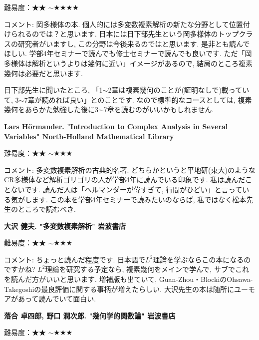 難易度：★★ $\sim$★★★★ \vspace{-6pt} 

コメント: 岡多様体の本. 個人的には多変数複素解析の新たな分野として位置付けられるのでは？と思います. 日本には日下部先生という岡多様体のトップクラスの研究者がいますし, この分野は今後来るのではと思います. 
是非とも読んでほしい. 学部4年セミナーで読んでも修士セミナーで読んでも良いです.  ただ「岡多様体は解析というよりは幾何に近い」イメージがあるので, 結局のところ複素幾何は必要だと思います.

日下部先生に聞いたところ, 「1$\sim$2章は複素幾何のことが(証明なしで)載っていて, 3$\sim$7章が読めれば良い」とのことです. なので標準的なコースとしては, 複素幾何をあらかた勉強した後に3$\sim$7章を読むのがいいかもしれません. 
\vspace{8pt}

\textbf{Lars Hörmander. "Introduction to Complex Analysis in Several Variables" North-Holland Mathematical Library}   \vspace{-6pt} 

難易度：★★ $\sim$★★★ \vspace{-6pt} 

コメント: 多変数複素解析の古典的名著. どちらかというと平地研(東大)のようなCR多様体など解析ゴリゴリの人が学部4年に読んでいる印象です. 私は読んだことないです. 読んだ人は「ヘルマンダーが偉すぎて, 行間がひどい」と言っている気がします. 
この本を学部4年セミナーで読みたいのならば, 私ではなく松本先生のところで読むべき. 
\vspace{8pt}

\textbf{大沢 健夫. "多変数複素解析" 岩波書店}  　\vspace{-6pt} 

難易度：★★ $\sim$★★★ 　\vspace{-6pt} 

コメント: ちょっと読んだ程度です. 日本語で$L^2$理論を学ぶならこの本になるのですかね? $L^2$理論を研究する予定なら, 複素幾何をメインで学んで, サブでこれを読んだ方がいいと思います. 
増補版も出ていて, Guan-Zhou・BlockiのOhsawa-Takegoshiの最良評価に関する事柄が増えたらしい. 
大沢先生の本は随所にユーモアがあって読んでいて面白い. 

\vspace{8pt}


\textbf{落合 卓四郎, 野口 潤次郎. "幾何学的関数論" 岩波書店}  　\vspace{-6pt} 

難易度：★★ $\sim$★★★ 　\vspace{-6pt} 

